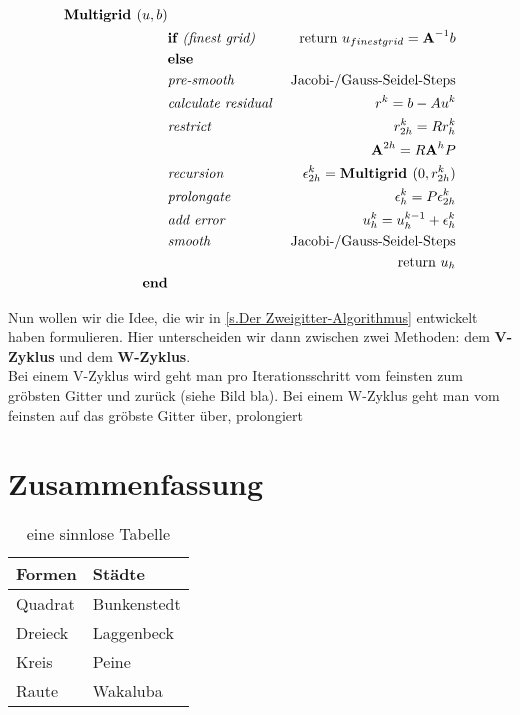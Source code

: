 \begin{eqnarray}
\textbf{Multigrid }(u,b) 			& \notag \\
&\textbf{if }\textit{(finest grid) }&\textnormal{return } u_{finest grid}={\textbf{A}}^{-1}b \notag \\
&\textbf{else }						& \notag \\
&\textit{pre-smooth } 				&\textnormal{Jacobi-/Gauss-Seidel-Steps} \notag \\
&\textit{calculate residual }		&r^{k} = b - Au^{k} \notag \\
&\textit{restrict } 				&r^{k}_{2h}=Rr^{k}_{h} \notag \\
&									&{\textbf{A}}^{2h} = R{\textbf{A}}^{h}P \notag \\
&\textit{recursion }				&\epsilon^{k}_{2h} = \textbf{Multigrid }(0,r^{k}_{2h}) \notag \\
&\textit{prolongate }				&\epsilon^{k}_{h} = P\epsilon^{k}_{2h} \notag \\
&\textit{add error }				&u^{k}_{h} = u^{k-1}_{h} + \epsilon^{k}_{h} \notag \\
&\textit{smooth }					&\textnormal{Jacobi-/Gauss-Seidel-Steps} \notag \\
&									&\textnormal{return } u_{h} \notag \\
\textbf{end}						& \notag
\end{eqnarray}

Nun wollen wir die Idee, die wir in \autoref{s.Der Zweigitter-Algorithmus} entwickelt haben formulieren. Hier unterscheiden wir dann zwischen zwei Methoden: dem \textbf{V-Zyklus} und dem \textbf{W-Zyklus}. \\
Bei einem V-Zyklus wird geht man pro Iterationsschritt vom feinsten zum gröbsten Gitter und zurück (siehe Bild bla). Bei einem W-Zyklus geht man vom feinsten auf das gröbste Gitter über, prolongiert 

\chapter{Zusammenfassung}\label{c.zusammenfassung}

\begin{table}[!hbt]\vspace{1ex}\centering\begin{tabular}{|l|l|}
\hline
Formen & Städte\\
\hline
\hline
Quadrat &  Bunkenstedt \\
\hline
Dreieck &  Laggenbeck\\
\hline
Kreis &  Peine\\
\hline
Raute & Wakaluba \\
\hline
\end{tabular}
\caption{\label{tab.sinnlos}eine sinnlose Tabelle}
\vspace{2ex}\end{table}

